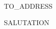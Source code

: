 \documentclass[]{letter}
\begin{document}

\begin{letter}{TO\_ADDRESS}
\address{ADDRESS}

\opening{SALUTATION}




\signature{}

\closing{}


\end{letter}
\end{document}
